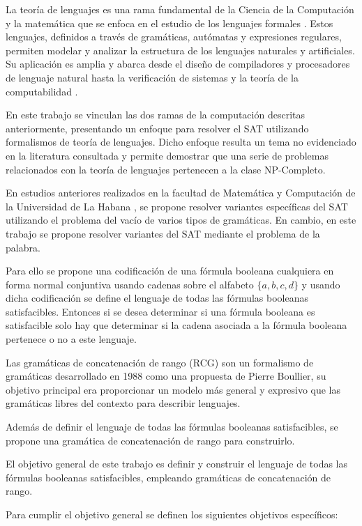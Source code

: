 \documentclass{article}
\begin{document}
La teoría de lenguajes es una rama fundamental de la Ciencia de la Computación y la matemática que se enfoca
en el estudio de los lenguajes formales \cite{authomataTheory}. Estos lenguajes, definidos a través de
gramáticas, autómatas y expresiones regulares, permiten modelar y analizar la estructura de los lenguajes
naturales y artificiales. Su aplicación es amplia y abarca desde el diseño de compiladores y procesadores de
lenguaje natural hasta la verificación de sistemas y la teoría de la computabilidad \cite{authomataTheory}.

En este trabajo se vinculan las dos ramas de la computación descritas anteriormente, presentando
un enfoque para resolver el SAT utilizando formalismos de teoría de lenguajes. Dicho enfoque resulta un
tema no evidenciado en la literatura consultada y permite demostrar que una serie de problemas
relacionados con la teoría de lenguajes pertenecen a la clase NP-Completo.

En estudios anteriores realizados en la facultad de Matemática y Computación de la Universidad de La Habana \cite{aCFSAT,aSRCSAT},
se propone resolver variantes específicas del SAT utilizando el problema del vacío de varios tipos de
gramáticas. En cambio, en este trabajo se propone resolver variantes del SAT mediante el problema de la
palabra.

Para ello se propone una codificación de una fórmula booleana cualquiera en forma normal conjuntiva usando
cadenas sobre el alfabeto $\{a,b,c,d\}$ y usando dicha codificación se define el lenguaje de todas las fórmulas
booleanas satisfacibles. Entonces si se desea determinar si una fórmula booleana es satisfacible
solo hay que determinar si la cadena asociada a la fórmula booleana pertenece o no a este lenguaje.

Las gramáticas de concatenación de rango (RCG) \cite{mainRCGBib} son un formalismo de
gramáticas desarrollado en 1988 como una propuesta de Pierre Boullier, su objetivo principal era
proporcionar un modelo más general y expresivo que las gramáticas libres del contexto para describir lenguajes.

Además de definir el lenguaje de todas las fórmulas booleanas satisfacibles, se propone una gramática de concatenación de rango para construirlo.

El objetivo general de este trabajo es definir y construir el lenguaje de todas las fórmulas booleanas satisfacibles, empleando gramáticas de concatenación de rango.

Para cumplir el objetivo general se definen los siguientes objetivos específicos:
\end{document}
